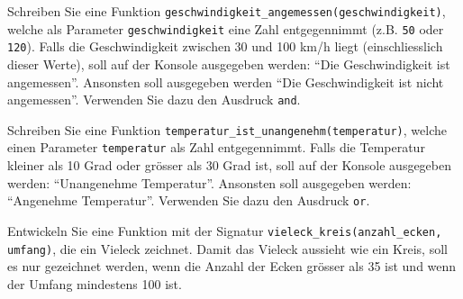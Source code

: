 \begin{myexercise}\label{ex:geschwindigkeitAngemessen}
	Schreiben Sie eine Funktion \lstinline|geschwindigkeit_angemessen(geschwindigkeit)|, welche als Parameter \lstinline|geschwindigkeit| eine Zahl entgegennimmt (z.B. \lstinline|50| oder \lstinline|120|). Falls die Geschwindigkeit zwischen 30 und 100 km/h liegt (einschliesslich dieser Werte), soll auf der Konsole ausgegeben werden: \enquote{Die Geschwindigkeit ist angemessen}. Ansonsten soll ausgegeben werden \enquote{Die Geschwindigkeit ist nicht angemessen}. Verwenden Sie dazu den Ausdruck \lstinline|and|.
	\begin{myanswer}
		
	\end{myanswer}
\end{myexercise}

\begin{myexercise}\label{ex:tempUnangenehm}
	Schreiben Sie eine Funktion \lstinline|temperatur_ist_unangenehm(temperatur)|, welche einen Parameter \lstinline|temperatur| als Zahl entgegennimmt. Falls die Temperatur kleiner als 10 Grad oder grösser als 30 Grad ist, soll auf der Konsole ausgegeben werden: \enquote{Unangenehme Temperatur}. Ansonsten soll ausgegeben werden: \enquote{Angenehme Temperatur}. Verwenden Sie dazu den Ausdruck \lstinline|or|.

	\begin{myanswer}
		
	\end{myanswer}
\end{myexercise}

\begin{myexercise}
	Entwickeln Sie eine Funktion mit der Signatur \lstinline|vieleck_kreis(anzahl_ecken, umfang)|, die ein Vieleck zeichnet. Damit das Vieleck aussieht wie ein Kreis, soll es nur gezeichnet werden, wenn die Anzahl der Ecken grösser als 35 ist und wenn der Umfang mindestens 100 ist.
	\begin{myanswer}
		
	\end{myanswer}
\end{myexercise}

